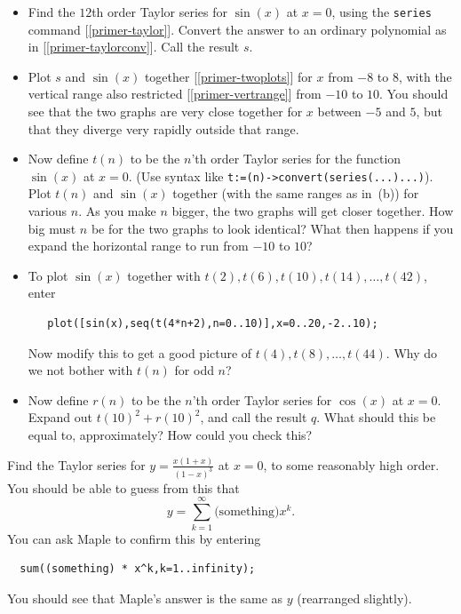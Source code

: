 \documentclass[a4paper,10pt]{amsbook}
\begin{document}
\begin{exercise}\label{ex-sin}
 \begin{itemize}
  \item[(a)] Find the $12$th order Taylor series for
   $\sin(x)$ at $x=0$, using the \verb~series~ command
   [\ref{primer-taylor}].  Convert the answer to an ordinary
   polynomial as in [\ref{primer-taylorconv}]. Call the result $s$. 
  \item[(b)] Plot $s$ and $\sin(x)$ together
   [\ref{primer-twoplots}] for $x$ from
   $-8$ to $8$, with the vertical range also restricted
   [\ref{primer-vertrange}]  from $-10$ to $10$.  You should see that
   the two graphs are very close together for $x$ between
   $-5$ and $5$, but that they diverge very rapidly outside
   that range. 
  \item[(c)] Now define $t(n)$ to be the $n$'th order Taylor
   series for the function $\sin(x)$ at $x=0$.  (Use syntax like 
   \verb~t:=(n)->convert(series(...)...)~).  Plot $t(n)$ and
   $\sin(x)$ together (with the same ranges as in~(b)) for
   various $n$.  As you make $n$ bigger, the two graphs will
   get closer together.  How big must $n$ be for the two
   graphs to look identical?  What then happens if you
   expand the horizontal range to run from $-10$ to $10$? 
  \item[(d)] To plot $\sin(x)$ together with
   $t(2),t(6),t(10),t(14),\ldots,t(42)$, enter
\begin{verbatim}
   plot([sin(x),seq(t(4*n+2),n=0..10)],x=0..20,-2..10);
\end{verbatim}
   Now modify this to get a good picture of
   $t(4),t(8),\ldots,t(44)$.  Why do we not bother with
   $t(n)$ for odd $n$? 
  \item[(e)] Now define $r(n)$ to be the $n$'th order Taylor
   series for $\cos(x)$ at $x=0$.  Expand out
   $t(10)^2+r(10)^2$, and call the result $q$.  What should
   this be equal to, approximately?  How could you check this? 
 \end{itemize}
\end{exercise}

\begin{exercise}\label{ex-rat}
 Find the Taylor series for $y=\frac{x(1+x)}{(1-x)^3}$ at
 $x=0$, to some reasonably high order.  You should be able
 to guess from this that
 \[ y = \sum_{k=1}^\infty \text{(something)} x^k. \]
 You can ask Maple to confirm this by entering
\begin{verbatim}
  sum((something) * x^k,k=1..infinity);
\end{verbatim}
 You should see that Maple's answer is the same as $y$
 (rearranged slightly). 
\end{exercise}
\end{document}
